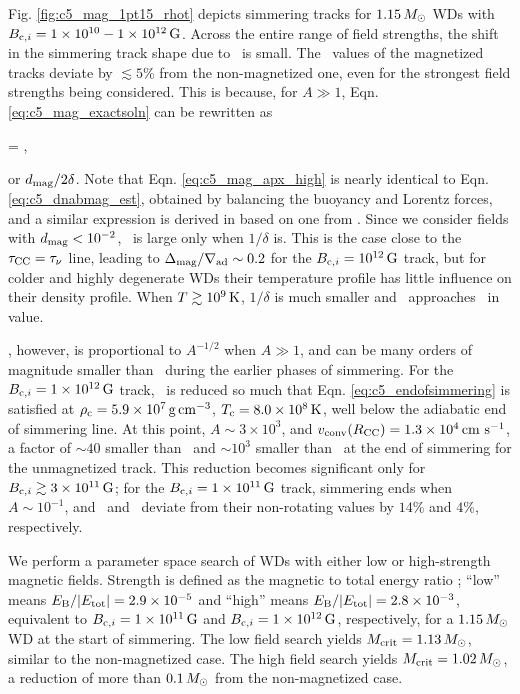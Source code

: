 Fig. \ref{fig:c5_mag_1pt15_rhot} depicts simmering tracks for $1.15\,\Msun$ WDs with $\Binit = 1\times10^{10}-1\times10^{12}\,\mrm{G}$.  Across the entire range of field strengths, the shift in the simmering track shape due to \dnabmag\ is small.  The \rhoc\ values of the magnetized tracks deviate by $\lesssim5$\% from the non-magnetized one, even for the strongest field strengths being considered.  This is because, for $A \gg 1$, Eqn. \ref{eq:c5_mag_exactsoln} can be rewritten as

\eqbegin
\dnabmag \approx {} = ,
\label{eq:c5_mag_apx_high}
\eqend

\noindent or $\dmag/2\delta$.  Note that Eqn. \ref{eq:c5_mag_apx_high} is nearly identical to Eqn. \ref{eq:c5_dnabmag_est}, obtained by balancing the buoyancy and Lorentz forces, and a similar expression is derived in \cite{macdm09} based on one from \cite{gougt66}.  Since we consider fields with $\dmag < 10^{-2}$, \dnabmag\ is large only when $1/\delta$ is.  This is the case close to the $\taucc = \taunu$ line, leading to $\dnabmag/\nablaad \sim 0.2$ for the $\Binit = 10^{12}\,\mrm{G}$ track, but for colder and highly degenerate WDs their temperature profile has little influence on their density profile.  When $T\gtrsim10^9\,\mathrm{K}$, $1/\delta$ is much smaller and \dnabmag\ approaches \dnabconv\ in value.

\vconv, however, is proportional to $A^{-1/2}$ when $A \gg 1$, and can be many orders of magnitude smaller than \vconvzero\ during the earlier phases of simmering.  For the $\Binit = 1\times10^{12}\,\mrm{G}$ track, \vconv\ is reduced so much that Eqn. \ref{eq:c5_endofsimmering} is satisfied at $\rhoc = 5.9\times10^7\,\gcc$, $\Tc = 8.0\times10^8\,\mrm{K}$, well below the adiabatic end of simmering line.  At this point, $A \sim 3\times10^3$, and $\vconvrcc = 1.3\times10^{4}\,\cmpsec$, a factor of $\sim40$ smaller than \vconvzero\ and $\sim10^3$ smaller than \vconvrcc\ at the end of simmering for the unmagnetized track.  This reduction becomes significant only for $\Binit \gtrsim 3\times10^{11}\,\mrm{G}$; for the $\Binit = 1\times10^{11}\,\mrm{G}$ track, simmering ends when $A \sim 10^{-1}$, and \rhoc\ and \Tc\ deviate from their non-rotating values by $14$\% and $4$\%, respectively.


We perform a parameter space search of WDs with either low or high-strength magnetic fields.  Strength is defined as the magnetic to total energy ratio \EBEtot; ``low'' means $\EBEtot = 2.9\times10^{-5}$ and ``high'' means $\EBEtot = 2.8\times10^{-3}$, equivalent to $\Binit = 1\times10^{11}\,\mrm{G}$ and $\Binit = 1\times10^{12}\,\mrm{G}$, respectively, for a $1.15\,\Msun$ WD at the start of simmering.  The low field search yields $\Mcrit = 1.13\,\Msun$, similar to the non-magnetized case.  The high field search yields $\Mcrit = 1.02\,\Msun$, a reduction of more than $0.1\,\Msun$ from the non-magnetized case.

